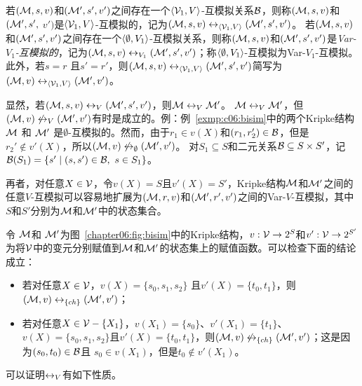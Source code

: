 若$({\cal M},s, v)$和$({\cal M}',s',v')$之间存在一个${\langle{{\cal V}_1, V}\rangle}$-互模拟关系${\cal B}$，则称$({\cal M},s, v)$和$({\cal M}',s',$ $v')$是${\langle{{\cal V}_1, V}\rangle}$-互模拟的，记为$({\cal M},s, v)\leftrightarrow_{\langle{{\cal V}_1, V}\rangle} ({\cal M}',s',v')$。
若$({\cal M},s, v)$和$({\cal M}',s',v')$之间存在一个${\langle{\emptyset, V_1}\rangle}$-互模拟关系，则称$({\cal M},s, v)$和$({\cal M}',s',v')$是{\em Var-$V_1$-互模拟的}，记为$({\cal M}, s,v) \leftrightarrow_{V_1} ({\cal M}',s',v')$；称${\langle{\emptyset, V_1}\rangle}$-互模拟为Var-$V_1$-互模拟。此外，若$s=r$ 且$s'=r'$，则$({\cal M}, s,v) \leftrightarrow_{{\langle{{\cal V}_1, V}\rangle}} ({\cal M}',s',v')$简写为$({\cal M}, v) \leftrightarrow_{{\langle{{\cal V}_1, V}\rangle}} ({\cal M}',v')$。

显然，若$({\cal M},s,v)\leftrightarrow_V({\cal M}',s',v')$，则${\cal M}\leftrightarrow_V{\cal M}'$。
${\cal M}\leftrightarrow_V{\cal M}'$，但$({\cal M},v)\not\leftrightarrow_V({\cal M}',v')$有时是成立的。例：例~\ref{exmp:c06:bisim}中的两个Kripke结构${\cal M}$ 和 ${\cal M}'$ 是$\emptyset$-互模拟的。然而，由于$r_1\in v(X)$和$(r_1,r_2')\in{\cal B}$，但是$r_2'\not\in v'(X)$，所以$({\cal M},v)\not\leftrightarrow_\emptyset ({\cal M}',v')$。
对$S_1\subseteq S$和二元关系${\cal B}\subseteq S \times S'$，记${\cal B}(S_1) =\{s' \mid (s, s')\in {\cal B},\ s \in S_1\}$。

再者，对任意$X\in {\cal V}$，令$v(X)=S$且$v'(X)=S'$，Kripke结构${\cal M}$和${\cal M}'$之间的任意$V$-互模拟可以容易地扩展为$({\cal M},r,v)$和$({\cal M}',r',v')$之间的Var-$V$-互模拟，其中$S$和$S'$分别为${\cal M}$和${\cal M}'$中的状态集合。

\begin{example}
	令 ${\cal M}$和 ${\cal M}'$为图~\ref{chapter06:fig:bisim}中的Kripke结构，$v: {\cal V} \rightarrow 2^S$和$v': {\cal V} \rightarrow 2^{S'}$为将${\cal V}$中的变元分别赋值到${\cal M}$和${\cal M}'$的状态集上的赋值函数。可以检查下面的结论成立：
	\begin{itemize}
		\item 若对任意$X\in\cal V$，$v(X)= \{s_0, s_1, s_2\}$ 且$v'(X)=\{t_0, t_1\}$，则$({\cal M},v)\leftrightarrow_{\{ch\}} ({\cal M}',v')$；
		
		\item 若对任意$X\in{\cal V}-\{X_1\}$，$v(X_1)= \{s_0\}$、$v'(X_1)=\{t_1\}$、$v(X)= \{s_0, s_1, s_2\}$且$v'(X)=\{t_0, t_1\}$，则$({\cal M},v)\not\leftrightarrow_{\{ch\}} ({\cal M}',v')$；这是因为$(s_0,t_0)\in {\cal B}$且 $s_0\in v(X_1)$，但是$t_0\notin v'(X_1)$。
	\end{itemize}
\end{example}



可以证明$\leftrightarrow_V$有如下性质。

